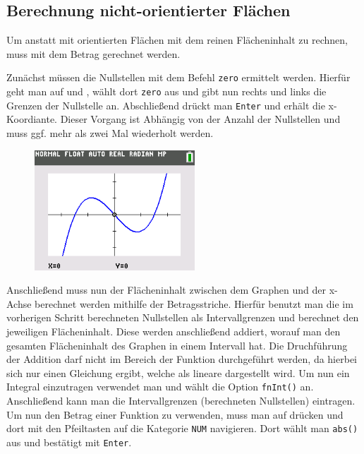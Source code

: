 \subsection{Berechnung nicht-orientierter Flächen}\label{sec:Berechnung nicht-orientierter Flaechen}
Um anstatt mit orientierten Flächen mit dem reinen Flächeninhalt zu rechnen, muss mit dem Betrag gerechnet werden.
\begin{paracol}{2}
\begin{flushleft}
	Zunächst müssen die Nullstellen mit dem Befehl \texttt{zero} ermittelt werden. Hierfür geht man auf  und , wählt dort \texttt{zero} aus und gibt nun rechts und links die Grenzen der Nullstelle an. Abschließend drückt man \texttt{Enter} und erhält die x-Koordiante. Dieser Vorgang ist Abhängig von der Anzahl der Nullstellen und muss ggf. mehr als zwei Mal wiederholt werden. 
\end{flushleft}	
\switchcolumn
\begin{flushright}
	\begin{figure}
		\includegraphics[width=6cm]{Media/GRT/Visualisierung/berechnung_nichtOrientierter_Flacheninhalt/berechnung_nichtOrientierter_Flacheninhalt_1.png}
		\caption{}

	\end{figure}
	\end{flushright}
\end{paracol}
Anschließend muss nun der Flächeninhalt zwischen dem Graphen und der x-Achse berechnet werden mithilfe der Betragsstriche. Hierfür benutzt man die im vorherigen Schritt berechneten Nullstellen als Intervallgrenzen und berechnet den jeweiligen Flächeninhalt. Diese werden anschließend addiert, worauf man den gesamten Flächeninhalt des Graphen in einem Intervall hat. 
	Die Druchführung der Addition darf nicht im Bereich der Funktion durchgeführt werden, da hierbei sich nur einen Gleichung ergibt, welche als lineare dargestellt wird. Um nun ein Integral einzutragen verwendet man  und wählt die Option \texttt{fnInt()} an. Anschließend kann man die Intervallgrenzen (berechneten Nullstellen) eintragen. Um nun den Betrag einer Funktion zu verwenden, muss man auf  drücken und dort mit den Pfeiltasten auf die Kategorie \texttt{NUM} navigieren. Dort wählt man \texttt{abs()} aus und bestätigt mit \texttt{Enter}. 
\pagebreak
